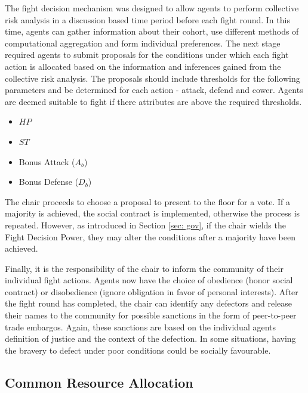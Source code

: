 
The fight decision mechanism was designed to allow agents to perform collective risk analysis in a discussion based time period before each fight round. In this time, agents can gather information about their cohort, use different methods of computational aggregation and form individual preferences. The next stage required agents to submit proposals for the conditions under which each fight action is allocated based on the information and inferences gained from the collective risk analysis. The proposals should include thresholds for the following parameters and be determined for each action - attack, defend and cower. Agents are deemed suitable to fight if there attributes are above the required thresholds.  

\begin{itemize}
    \item $HP$
    \item $ST$
    \item Bonus Attack ($A_b$)
    \item Bonus Defense ($D_b$)
\end{itemize}

The chair proceeds to choose a proposal to present to the floor for a vote. If a majority is achieved, the social contract is implemented, otherwise the process is repeated. However, as introduced in Section \ref{sec: gov}, if the chair wields the Fight Decision Power, they may alter the conditions after a majority have been achieved. 

Finally, it is the responsibility of the chair to inform the community of their individual fight actions. Agents now have the choice of obedience (honor social contract) or disobedience (ignore obligation in favor of personal interests). After the fight round has completed, the chair can identify any defectors and release their names to the community for possible sanctions in the form of peer-to-peer trade embargos. Again, these sanctions are based on the individual agents definition of justice and the context of the defection. In some situations, having the bravery to defect under poor conditions could be socially favourable. 

\subsection{Common Resource Allocation}\label{sec: cmr}

